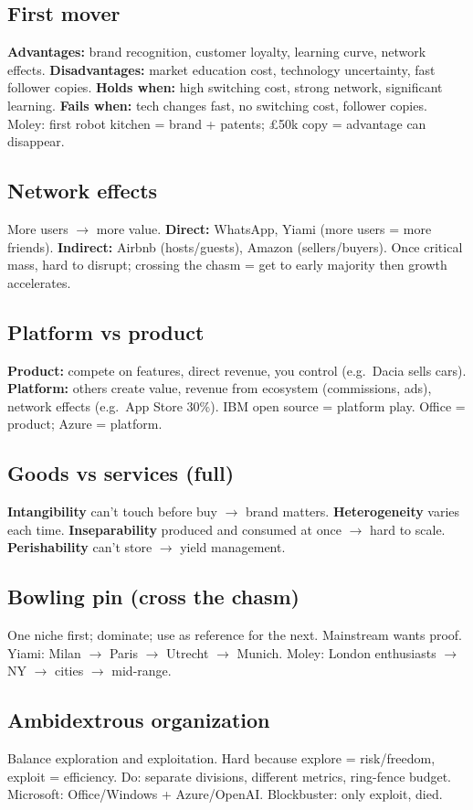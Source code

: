 \documentclass[8pt,a4paper]{article}
\begin{document}
\subsection*{First mover}
\textbf{Advantages:} brand recognition, customer loyalty, learning curve, network effects. \textbf{Disadvantages:} market education cost, technology uncertainty, fast follower copies. \textbf{Holds when:} high switching cost, strong network, significant learning. \textbf{Fails when:} tech changes fast, no switching cost, follower copies. Moley: first robot kitchen = brand + patents; £50k copy = advantage can disappear.

\subsection*{Network effects}
More users $\to$ more value. \textbf{Direct:} WhatsApp, Yiami (more users = more friends). \textbf{Indirect:} Airbnb (hosts/guests), Amazon (sellers/buyers). Once critical mass, hard to disrupt; crossing the chasm = get to early majority then growth accelerates.

\subsection*{Platform vs product}
\textbf{Product:} compete on features, direct revenue, you control (e.g.\ Dacia sells cars). \textbf{Platform:} others create value, revenue from ecosystem (commissions, ads), network effects (e.g.\ App Store 30\%). IBM open source = platform play. Office = product; Azure = platform.

\subsection*{Goods vs services (full)}
\textbf{Intangibility} can't touch before buy $\to$ brand matters. \textbf{Heterogeneity} varies each time. \textbf{Inseparability} produced and consumed at once $\to$ hard to scale. \textbf{Perishability} can't store $\to$ yield management.

\subsection*{Bowling pin (cross the chasm)}
One niche first; dominate; use as reference for the next. Mainstream wants proof. Yiami: Milan $\to$ Paris $\to$ Utrecht $\to$ Munich. Moley: London enthusiasts $\to$ NY $\to$ cities $\to$ mid-range.

\subsection*{Ambidextrous organization}
Balance exploration and exploitation. Hard because explore = risk/freedom, exploit = efficiency. Do: separate divisions, different metrics, ring-fence budget. Microsoft: Office/Windows + Azure/OpenAI. Blockbuster: only exploit, died.
\end{document}
